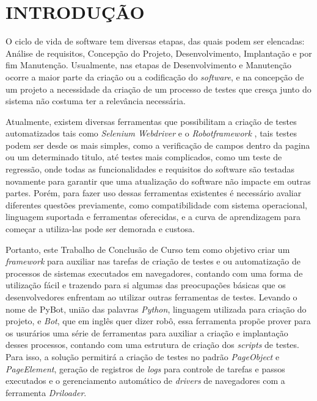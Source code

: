 %
%

\chapter{INTRODUÇÃO}\label{chap:introducao}

O ciclo de vida de software tem diversas etapas, das quais podem ser elencadas: Análise de requisitos, Concepção do Projeto, Desenvolvimento,
Implantação e por fim Manutenção. Usualmente, nas etapas de Desenvolvimento e Manutenção ocorre a maior parte da criação ou a codificação do
\textit{software}, e na concepção de um projeto a necessidade da criação de um processo de testes que cresça junto do sistema não costuma ter
a relevância necessária.

Atualmente, existem diversas ferramentas que possibilitam a criação de testes automatizados tais como \emph{Selenium Webdriver} \cite{selenium}
e o \emph{Robotframework} \cite{robotframework}, tais testes podem ser desde os mais simples, como a verificação de campos dentro da pagina
ou um determinado titulo, até testes mais complicados, como um teste de regressão, onde todas as funcionalidades e requisitos
do software são testadas novamente para garantir que uma atualização do software não impacte em outras partes. Porém, para fazer uso dessas
ferramentas existentes é necessário avaliar diferentes questões previamente, como compatibilidade com sistema operacional, linguagem suportada
e ferramentas oferecidas, e a curva de aprendizagem para começar a utiliza-las pode ser demorada e custosa.

Portanto, este Trabalho de Conclusão de Curso tem como objetivo criar um \textit{framework} para auxiliar nas tarefas de criação de testes e ou
automatização de processos de sistemas executados em navegadores, contando com uma forma de utilização fácil e trazendo para si algumas das
preocupações básicas que os desenvolvedores enfrentam ao utilizar outras ferramentas de testes. Levando o nome de PyBot, união das palavras \emph{Python},
linguagem utilizada para criação do projeto, e \emph{Bot}, que em inglês quer dizer robô, essa ferramenta propõe prover para os usurários uma série de
ferramentas para auxiliar a criação e implantação desses processos, contando com uma estrutura de criação dos \emph{scripts} de testes. Para isso,
a solução permitirá a criação de testes no padrão \emph{PageObject} e \emph{PageElement}, geração de registros de \emph{logs} para controle de tarefas e passos
executados e o gerenciamento automático de \emph{drivers} de navegadores com a ferramenta \emph{Driloader}.


